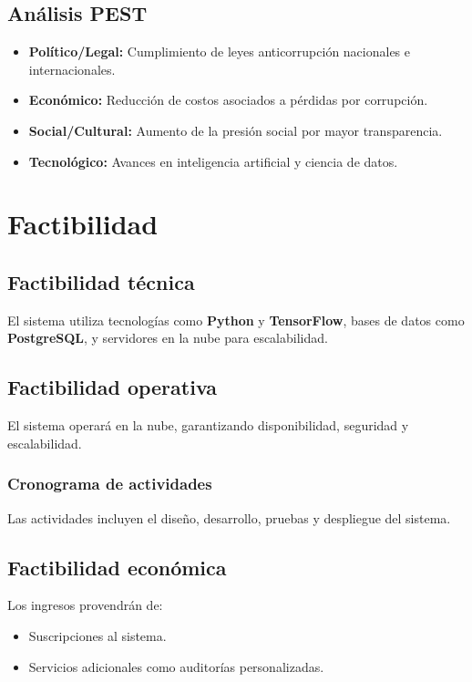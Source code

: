 \documentclass[a4paper,12pt]{article}
\begin{document}
\subsection{Análisis PEST}
\begin{itemize}
    \item \textbf{Político/Legal:} Cumplimiento de leyes anticorrupción nacionales e internacionales.
    \item \textbf{Económico:} Reducción de costos asociados a pérdidas por corrupción.
    \item \textbf{Social/Cultural:} Aumento de la presión social por mayor transparencia.
    \item \textbf{Tecnológico:} Avances en inteligencia artificial y ciencia de datos.
\end{itemize}

\section{Factibilidad}

\subsection{Factibilidad técnica}
El sistema utiliza tecnologías como \textbf{Python} y \textbf{TensorFlow}, bases de datos como \textbf{PostgreSQL}, y servidores en la nube para escalabilidad.

\subsection{Factibilidad operativa}
El sistema operará en la nube, garantizando disponibilidad, seguridad y escalabilidad.

\subsubsection{Cronograma de actividades}
Las actividades incluyen el diseño, desarrollo, pruebas y despliegue del sistema.

\subsection{Factibilidad económica}
Los ingresos provendrán de:
\begin{itemize}
    \item Suscripciones al sistema.
    \item Servicios adicionales como auditorías personalizadas.
\end{itemize}
\end{document}

